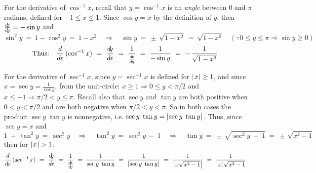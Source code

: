For the derivative of $\cos^{-1} x$,
recall that $y = \cos^{-1} x$ is an \emph{angle} between $0$ and $\pi$ radians,
defined for $-1 \le x \le 1$. Since $\cos y = x$ by the definition of $y$, then
$\frac{d\negmedspace x}{d\!y} = -\sin y$ and
\begin{displaymath}
 \sin^2 y ~=~ 1 - \cos^2 y ~=~ 1 - x^2 \quad\Rightarrow\quad
 \sin y ~=~ \pm\,\sqrt{1 - x^2} ~=~ \sqrt{1 - x^2} \quad\left(\because 0 \le y \le \pi \Rightarrow \sin y \ge 0\right)
\end{displaymath}
\begin{displaymath}
 \text{Thus:}\quad\frac{d}{d\!x}\,(\cos^{-1} x) ~=~ \frac{d\negmedspace y}{d\!x} ~=~ \frac{1}{\frac{d\negmedspace x}{d\!y}} ~=~ \frac{1}{-\sin y} ~=~
  -\,\frac{1}{\sqrt{1 - x^2}} \quad\relax
 \end{displaymath}

\noindent For the derivative of $\sec^{-1} x$, since $y = \sec^{-1} x$
is defined for $\lvert\mspace{1mu}x\mspace{1mu}\rvert \ge 1$, and since $x = \sec y = \frac{1}{\cos
  y}$, from the unit-circle: $x \ge 1 \Rightarrow 0 \le y < \pi/2$ and
$x \le -1 \Rightarrow \pi/2 < y \le \pi$.  Recall also that $\sec y$
and $\tan y$ are both positive when
$0 < y < \pi/2$ and are both negative when $\pi/2 < y < \pi$. So in both cases
the product $\sec y \; \tan y$ is nonnegative, i.e.
$\sec y \; \tan y = \lvert\mspace{1mu}\sec y \; \tan y\mspace{1mu}\rvert$. Thus, since $\sec y = x$ and
\begin{displaymath}
 1 ~+~ \tan^2 y ~=~ \sec^2 y \quad\Rightarrow\quad \tan^2 y ~=~ \sec^2 y ~-~ 1 \quad\Rightarrow\quad
 \tan y ~=~ \pm\,\sqrt{\sec^2 y ~-~ 1} ~=~ \pm\,\sqrt{x^2 - 1}
\end{displaymath}
\indent then for $\lvert\mspace{1mu}x\mspace{1mu}\rvert > 1$:
\[
 \frac{d}{d\!x}\,(\sec^{-1} x) ~=~ \frac{d\negmedspace y}{d\!x} ~=~ \frac{1}{\frac{d\negmedspace x}{d\!y}} ~=~ \frac{1}{\sec y \; \tan y} ~=~
  \frac{1}{\lvert\mspace{1mu}\sec y \; \tan y\mspace{1mu}\rvert} ~=~ \frac{1}{\bigl\lvert\mspace{1mu}x \sqrt{x^2 - 1}\mspace{1mu}\bigr\rvert} ~=~
  \frac{1}{\lvert\mspace{1mu}x\mspace{1mu}\rvert\sqrt{x^2 - 1}} \quad\relax
 \]

